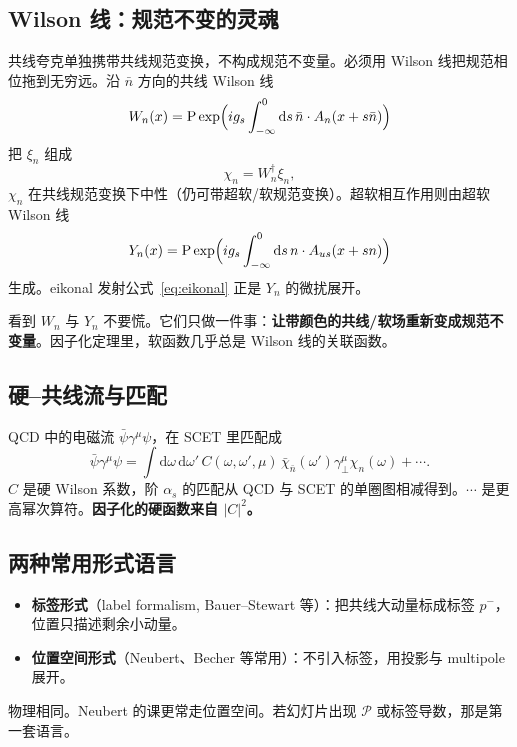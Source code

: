 \documentclass[11pt,a4paper]{article}
\theoremstyle{definition}
\theoremstyle{plain}
\theoremstyle{remark}
\newcommand{\dd}{\mathrm{d}}
\begin{document}
\subsection{Wilson 线：规范不变的灵魂}

共线夸克单独携带共线规范变换，不构成规范不变量。必须用 Wilson 线把规范相位拖到无穷远。沿 $\bar n$ 方向的共线 Wilson 线
\begin{equation}
\label{eq:Wn}
  W_n(x)=\mathrm{P}\exp\Bigl(ig_s\int_{-\infty}^{0}\dd s\,\bar n\cdot A_n(x+s\bar n)\Bigr)
\end{equation}
把 $\xi_n$ 组成
\begin{equation}
  \chi_n=W_n^\dagger\xi_n,
\end{equation}
$\chi_n$ 在共线规范变换下中性（仍可带超软/软规范变换）。超软相互作用则由超软 Wilson 线
\begin{equation}
  Y_n(x)=\mathrm{P}\exp\Bigl(ig_s\int_{-\infty}^{0}\dd s\,n\cdot A_{us}(x+sn)\Bigr)
\end{equation}
生成。eikonal 发射公式~\eqref{eq:eikonal} 正是 $Y_n$ 的微扰展开。

\begin{keybox}
看到 $W_n$ 与 $Y_n$ 不要慌。它们只做一件事：\textbf{让带颜色的共线/软场重新变成规范不变量}。因子化定理里，软函数几乎总是 Wilson 线的关联函数。
\end{keybox}

\subsection{硬--共线流与匹配}

QCD 中的电磁流 $\bar\psi\gamma^\mu\psi$，在 SCET 里匹配成
\begin{equation}
\label{eq:current}
  \bar\psi\gamma^\mu\psi
  = \int\dd\omega\,\dd\omega'\,C(\omega,\omega',\mu)\,
  \bar\chi_{\bar n}(\omega')\gamma^\mu_\perp\chi_n(\omega)+\cdots.
\end{equation}
$C$ 是硬 Wilson 系数，阶 $\alpha_s$ 的匹配从 QCD 与 SCET 的单圈图相减得到。$\cdots$ 是更高幂次算符。\textbf{因子化的硬函数来自 $|C|^2$。}

\subsection{两种常用形式语言}

\begin{itemize}[leftmargin=1.4em]
  \item \textbf{标签形式}（label formalism, Bauer--Stewart 等）：把共线大动量标成标签 $p^-$，位置只描述剩余小动量。
  \item \textbf{位置空间形式}（Neubert、Becher 等常用）：不引入标签，用投影与 multipole 展开。
\end{itemize}
物理相同。Neubert 的课更常走位置空间。若幻灯片出现 $\mathcal{P}$ 或标签导数，那是第一套语言。
\end{document}
